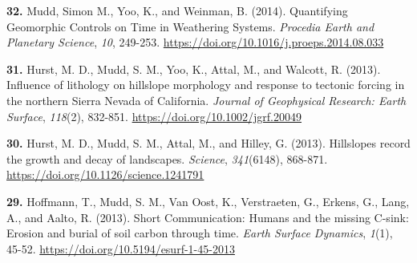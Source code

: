 \documentclass[10pt, a4paper]{article}
\newcommand{\years}[1]{\marginnote{\scriptsize #1}}
\begin{document}
\years{2014}\hangindent=0.7cm\textbf{32. }Mudd, Simon M., Yoo, K., and Weinman, B. (2014). Quantifying Geomorphic Controls on Time in Weathering Systems. \textit{Procedia Earth and Planetary Science}, \textit{10}, 249-253. \href{https://doi.org/10.1016/j.proeps.2014.08.033}{https://doi.org/10.1016/j.proeps.2014.08.033}\par
\years{2013}\hangindent=0.7cm\textbf{31. }Hurst, M. D., Mudd, S. M., Yoo, K., Attal, M., and Walcott, R. (2013). Influence of lithology on hillslope morphology and response to tectonic forcing in the northern Sierra Nevada of California. \textit{Journal of Geophysical Research: Earth Surface}, \textit{118}(2), 832-851. \href{https://doi.org/10.1002/jgrf.20049}{https://doi.org/10.1002/jgrf.20049}\par

\years{2013}\hangindent=0.7cm\textbf{30. }Hurst, M. D., Mudd, S. M., Attal, M., and Hilley, G. (2013). Hillslopes record the growth and decay of landscapes. \textit{Science}, \textit{341}(6148), 868-871. \href{https://doi.org/10.1126/science.1241791}{https://doi.org/10.1126/science.1241791}\par
\years{2013}\hangindent=0.7cm\textbf{29. }Hoffmann, T., Mudd, S. M., Van Oost, K., Verstraeten, G., Erkens, G., Lang, A., and Aalto, R. (2013). Short Communication: Humans and the missing C-sink: Erosion and burial of soil carbon through time. \textit{Earth Surface Dynamics}, \textit{1}(1), 45-52. \href{https://doi.org/10.5194/esurf-1-45-2013}{https://doi.org/10.5194/esurf-1-45-2013}\par
\end{document}
